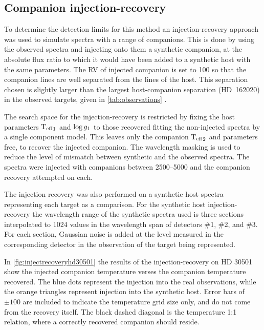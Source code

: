 
\subsection{Companion injection-recovery}
\label{subsec:injection-recovery}
To determine the detection limits for this method an injection-recovery approach was used to simulate spectra with a range of companions.
This is done by using the observed spectra and injecting onto them a synthetic companion, at the absolute flux ratio to which it would have been added to a synthetic host with the same parameters.
The {RV} of injected companion is set to 100\kmps{} so that the companion lines are well separated from the lines of the host.
This separation chosen is slightly larger than the largest host-companion separation ({HD~162020}) in the observed targets, given in \cref{tab:observations} \Rvtwo{}.

The search space for the injection-recovery is restricted by fixing the host parameters \({\textrm{T}_{\mathrm{eff}}}_{1}\) and \(\log{g}{}_{1}\) to those recovered fitting the non-injected spectra by a single component model.
This leaves only the companion \({\textrm{T}_{\mathrm{eff}}}_{2}\) and \Rvtwo{} parameters free, to recover the injected companion.
The wavelength masking is used to reduce the level of mismatch between synthetic and the observed spectra.
The spectra were injected with companions between 2500--5000\K{} and the companion recovery attempted on each.

The injection recovery was also performed on a synthetic host spectra representing each target as a comparison.
For the synthetic host injection-recovery the wavelength range of the synthetic spectra used is three sections interpolated to 1024 values in the wavelength span of detectors \#1, \#2, and \#3.
For each section, Gaussian noise is added at the level measured in the corresponding detector in the observation of the target being represented.

In \cref{fig:injectrecoveryhd30501} the results of the injection-recovery on {HD 30501} show the injected companion temperature verses the companion temperature recovered.
The blue dots represent the injection into the real observations, while the orange triangles represent injection into the synthetic host.
Error bars of \(\pm100\)\K{} are included to indicate the temperature grid size only, and do not come from the recovery itself.
The black dashed diagonal is the temperature 1:1 relation, where a correctly recovered companion should reside.

